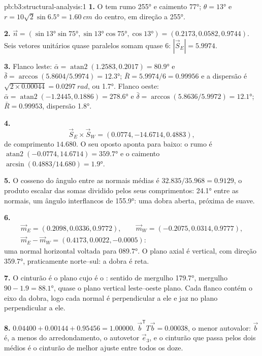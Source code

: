 \begin{solution}{pb:b3:structural-analysis:1}
\textbf{1.} O  tem rumo \ang{255} e caimento \ang{77}; $\theta =
\ang{13}$ e $r = 10\sqrt2\sin\ang{6.5} = \qty{1.60}{cm}$ do centro,
em direção a \ang{255}.

\textbf{2.} $\vec n = (\sin\ang{13}\sin\ang{75}, \sin\ang{13}\cos\ang{75},
\cos\ang{13}) = (0.2173, 0.0582, 0.9744)$. Seis vetores unitários quase
paralelos somam quase 6: $|\vec S_E| = 5.9974$.

\textbf{3.} Flanco leste: $\bar\alpha = \operatorname{atan2}(1.2583, 0.2017) =
\ang{80.9}$ e $\bar\delta = \arccos(5.8604/5.9974) = \ang{12.3}$; $\bar R
= 5.9974/6 = 0.99956$ e a dispersão é $\sqrt{2\times0.00044} =
\qty{0.0297}{rad}$, ou \ang{1.7}. Flanco oeste: $\bar\alpha =
\operatorname{atan2}(-1.2445, 0.1886) = \ang{278.6}$ e $\bar\delta =
\arccos(5.8636/5.9972) = \ang{12.1}$; $\bar R = 0.99953$, dispersão \ang{1.8}.

\textbf{4.}
\[
  \vec S_E\times\vec S_W = (0.0774, -14.6714, 0.4883),
\]
de comprimento $14.680$. O seu oposto aponta para baixo: o rumo é $\operatorname{atan2}(-0.0774, 14.6714) = \ang{359.7}$ e o
caimento $\arcsin(0.4883/14.680) = \ang{1.9}$.

\textbf{5.} O cosseno do ângulo entre as normais médias é
$32.835/35.968 = 0.9129$, o produto escalar das somas dividido pelos seus
comprimentos: \ang{24.1} entre as normais, um ângulo interflancos de \ang{155.9}:
uma dobra aberta, próxima de suave.

\textbf{6.}
\begin{gather*}
  \vec m_E = (0.2098, 0.0336, 0.9772),\qquad \vec m_W = (-0.2075, 0.0314, 0.9777),\\
  \vec m_E - \vec m_W = (0.4173, 0.0022, -0.0005):
\end{gather*}
uma normal horizontal voltada para \ang{089.7}. O plano axial é vertical, com direção
\ang{359.7}, praticamente norte--sul: a dobra é reta.

\textbf{7.} O cinturão é o plano cujo  é o : sentido de mergulho
\ang{179.7}, mergulho $90 - 1.9 = \ang{88.1}$, quase o plano vertical leste--oeste
plano. Cada flanco contém o eixo da dobra, logo cada normal é perpendicular a
ele e jaz no plano perpendicular a ele.

\textbf{8.} $0.04400 + 0.00144 + 0.95456 = 1.00000$. $\vec b^{\mathsf T}T\vec
b = 0.00038$, o menor autovalor: $\vec b$ é, a menos do arredondamento, o
autovetor $\vec e_3$, e o cinturão que passa pelos dois  médios é o
cinturão de melhor ajuste entre todos os doze.


\end{solution}
